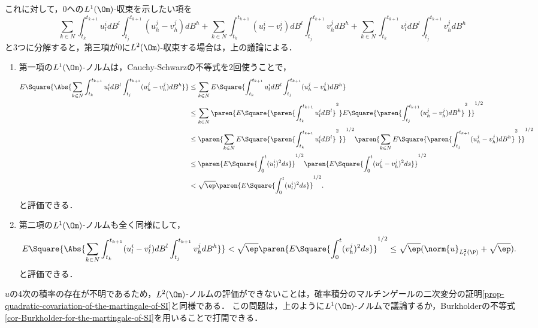 \documentclass[uplatex,dvipdfmx]{jsreport}
\begin{document}
\begin{Proof}
\begin{enumerate}
\begin{description}
            これに対して，$0$への$L^1(\Om)$-収束を示したい項を
            \[\sum_{k\in N}\int^{t_{k+1}}_{t_k}u^i_ldB^l\int^{t_{k+1}}_{t_j}(u^j_h-v^j_h)dB^h+\sum_{k\in N}\int^{t_{k+1}}_{t_k}(u^i_l-v^i_l)dB^l\int^{t_{k+1}}_{t_j}v^j_hdB^h+\sum_{k\in N}\int^{t_{k+1}}_{t_k}v^i_ldB^l\int^{t_{k+1}}_{t_j}v^j_hdB^h\]
            と3つに分解すると，第三項が$0$に$L^2(\Om)$-収束する場合は，上の議論による．
            \begin{enumerate}
                \item 第一項の$L^1(\Om)$-ノルムは，Cauchy-Schwarzの不等式を2回使うことで，
                \begin{align*}
                    E\Square{\Abs{\sum_{k\in N}\int^{t_{k+1}}_{t_k}u^i_ldB^l\int^{t_{k+1}}_{t_j}(u^j_h-v^j_h)dB^h}}&\le \sum_{k\in N}E\Square{\int^{t_{k+1}}_{t_k}u^i_ldB^l\int^{t_{k+1}}_{t_j}(u^j_h-v^j_h)dB^h}\\
                    &\le\sum_{k\in N}\paren{E\Square{\paren{\int^{t_{k+1}}_{t_k}u^i_ldB^l}^2}E\Square{\paren{\int^{t_{k+1}}_{t_j}(u^j_h-v^j_h)dB^h}^2}}^{1/2}\\
                    &\le\paren{\sum_{k\in N}E\Square{\paren{\int^{t_{k+1}}_{t_k}u^i_ldB^l}^2}}^{1/2}\paren{\sum_{k\in N}E\Square{\paren{\int^{t_{k+1}}_{t_j}(u^j_h-v^j_h)dB^h}^2}}^{1/2}\\
                    &\le\paren{E\Square{\int^t_0(u^i_l)^2ds}}^{1/2}\paren{E\Square{\int^t_0(u^j_h-v^j_h)^2ds}}^{1/2}\\
                    &<\sqrt{\ep}\paren{E\Square{\int^t_0(u^i_l)^2ds}}^{1/2}.
                \end{align*}
                と評価できる．
                \item 第二項の$L^1(\Om)$-ノルムも全く同様にして，
                \begin{align*}
                    E\Square{\Abs{\sum_{k\in N}\int^{t_{k+1}}_{t_k}(u^i_l-v^i_l)dB^l\int^{t_{k+1}}_{t_j}v^j_hdB^h}}
                    <\sqrt{\ep}\paren{E\Square{\int^t_0(v^j_h)^2ds}}^{1/2}\le
                    \sqrt{\ep}(\norm{u}_{L^2_t(\P)}+\sqrt{\ep}).
                \end{align*}
                と評価できる．
            \end{enumerate}
        \end{description}
    \end{enumerate}
\end{Proof}
\begin{remarks}[11/16の講究の焦点]
    $u$の4次の積率の存在が不明であるため，$L^2(\Om)$-ノルムの評価ができないことは，確率積分のマルチンゲールの二次変分の証明\ref{prop-quadratic-covariation-of-the-martingale-of-SI}と同様である．
    この問題は，上のように$L^1(\Om)$-ノルムで議論するか，Burkholderの不等式\ref{cor-Burkholder-for-the-martingale-of-SI}を用いることで打開できる．
\end{remarks}
\end{document}
